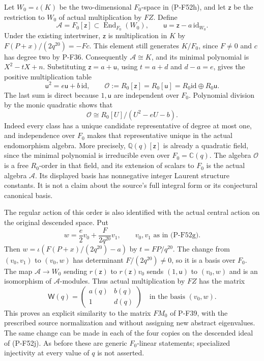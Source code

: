Let $W_0=\iota(K)$ be the two-dimensional $F_0$-space in
(P-F52h), and let $\mathsf z$ be the restriction to $W_0$
of actual multiplication by $FZ$. Define
\[
 \mathcal A=F_0[\mathsf z]\subset\operatorname{End}_{F_0}(W_0),
 \qquad \mathsf u=\mathsf z-a\,\mathrm{id}_{W_0}.
                                                               \tag{P-F52ab}
\]
Under the existing intertwiner, $\mathsf z$ is multiplication
in $K$ by $F(P+x)/(2q^{20})=-Fc$. This element still generates
$K/F_0$, since $F\ne0$ and $c$ has degree two by P-F36.
Consequently $\mathcal A\cong K$, and its minimal polynomial
is $X^2-tX+n$. Substituting $\mathsf z=a+\mathsf u$,
using $t=a+d$ and $d-a=e$, gives the positive multiplication
table
\[
       \mathsf u^2=e\mathsf u+b\,\mathrm{id},\qquad
 \mathcal O:=R_0[\mathsf z]=R_0[\mathsf u]
       =R_0\mathrm{id}\oplus R_0\mathsf u.
                                                               \tag{P-F52ac}
\]
The last sum is direct because $1,\mathsf u$ are independent
over $F_0$. Polynomial division by the monic quadratic shows
that
\[
           \mathcal O\cong R_0[U]/(U^2-eU-b).
\]
Indeed every class has a unique candidate representative of
degree at most one, and independence over $F_0$ makes that
representative unique in the actual endomorphism algebra.
More precisely, $\mathbb Q(q)[\mathsf z]$ is already a
quadratic field, since the minimal polynomial is irreducible
even over $F_0=\mathbb C(q)$. The algebra $\mathcal O$ is a
free $R_0$-order in that field, and its extension of scalars
to $F_0$ is the actual algebra $\mathcal A$.
Its displayed basis has nonnegative integer Laurent structure constants.
It is not a claim about the source's full integral form or
its conjectural canonical basis.

The regular action of this order is also identified with the
actual central action on the original descended space. Put
\[
       w=\frac{e}{2}v_0+\frac{F}{2q^{20}}v_1,
       \qquad v_0,v_1\text{ as in (P-F52g)}.
                                                               \tag{P-F52ad}
\]
Then $w=\iota(F(P+x)/(2q^{20})-a)$ by $t=FP/q^{20}$.
The change from $(v_0,v_1)$ to $(v_0,w)$ has determinant
$F/(2q^{20})\ne0$, so it is a basis over $F_0$.
The map $\mathcal A\to W_0$ sending
$r(\mathsf z)$ to $r(\mathsf z)v_0$ sends $(1,\mathsf u)$
to $(v_0,w)$ and is an isomorphism of $\mathcal A$-modules.
Thus actual multiplication by $FZ$ has the matrix
\[
             \mathsf W(q)=
                 \begin{pmatrix}a(q)&b(q)\\1&d(q)\end{pmatrix}
                    \quad\text{in the basis }(v_0,w).
                                                               \tag{P-F52ae}
\]
This proves an explicit similarity to the matrix $FM_0$ of
P-F39, with the prescribed source normalization and without
assigning new abstract eigenvalues. The same change can be
made in each of the four copies on the descended ideal of
(P-F52j). As before these are generic $F_0$-linear statements;
specialized injectivity at every value of $q$ is not asserted.

